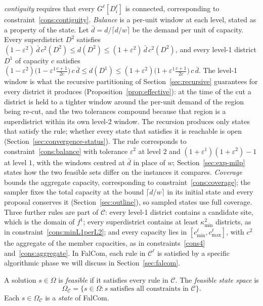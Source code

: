 \documentclass[11pt]{article}
\theoremstyle{definition}
\begin{document}
\emph{contiguity} requires that every $G^\ell[D_i^\ell]$ is connected, corresponding to constraint~\eqref{cons:contiguity}. \emph{Balance} is a per-unit window at each level, stated as a property of the state. Let $\bar d = d/\lceil d/w\rceil$ be the demand per unit of capacity. Every superdistrict $D^2$ satisfies $(1{-}\varepsilon^2)\,\bar d\, c^2(D^2) \leq d(D^2) \leq (1{+}\varepsilon^2)\,\bar d\, c^2(D^2)$, and every level-1 district $D^1$ of capacity $c$ satisfies $(1{-}\varepsilon^2)\bigl(1 - \varepsilon^1\tfrac{c+1}{2c}\bigr)\, c\, \bar d \leq d(D^1) \leq (1{+}\varepsilon^2)\bigl(1 + \varepsilon^1\tfrac{c+1}{2c}\bigr)\, c\, \bar d$. The level-1 window is what the recursive partitioning of Section~\ref{sec:recursive} guarantees for every district it produces (Proposition~\ref{prop:effective}): at the time of the cut a district is held to a tighter window around the per-unit demand of the region being re-cut, and the two tolerances compound because that region is a superdistrict within its own level-2 window. The recursion produces only states that satisfy the rule; whether every state that satisfies it is reachable is open (Section~\ref{sec:convergence-status}). The rule corresponds to constraint~\eqref{cons:balance} with tolerance $\varepsilon^2$ at level $2$ and $(1{+}\varepsilon^1)(1{+}\varepsilon^2)-1$ at level $1$, with the windows centred at $\bar d$ in place of $w$; Section~\ref{sec:exp-milp} states how the two feasible sets differ on the instances it compares. \emph{Coverage} bounds the aggregate capacity, corresponding to constraint~\eqref{cons:coverage}; the sampler fixes the total capacity at the bound $\lceil d/w\rceil$ in its initial state and every proposal conserves it (Section~\ref{sec:outline}), so sampled states use full coverage. Three further rules are part of $\mathcal{C}$: every level-1 district contains a candidate site, which is the domain of $f^1$; every superdistrict contains at least $\kappa^2_{\min}$ districts, as in constraint~\eqref{cons:minL1perL2}; and every capacity lies in $[c^\ell_{\min}, c^\ell_{\max}]$, with $c^2$ the aggregate of the member capacities, as in constraints~\eqref{cons4} and~\eqref{cons:aggregate}. In FalCom, each rule in $\mathcal{C}^\ell$ is satisfied by a specific algorithmic phase we will discuss in Section~\ref{sec:falcom}.

A solution $s \in \Omega$ is \emph{feasible} if it satisfies every rule in
$\mathcal{C}$. The \emph{feasible state space} is
%
\begin{equation}\label{eq:feasible}
    \Omega_\mathcal{C} = \bigl\{ s \in \Omega :
    s \text{ satisfies all constraints in } \mathcal{C} \bigr\}.
\end{equation}
%
Each $s \in \Omega_\mathcal{C}$ is a \emph{state} of FalCom.
\end{document}
